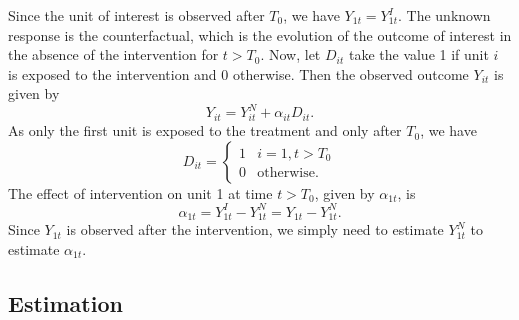 \documentclass[12pt,nobind, a4paper]{reedthesis}
\begin{document}
 Since the unit of interest is observed after \(T_0\), we have \(Y_{1t}=Y^{I}_{1t}\). The unknown response is the counterfactual, which is the evolution of the outcome of interest in the absence of the intervention for \(t>T_0\). Now, let \(D_{it}\) take the value 1 if unit \(i\) is exposed to the intervention and 0 otherwise. Then the observed outcome \(Y_{it}\) is given by
 \begin{equation}
 Y_{it}= Y^{N}_{it} + \alpha_{it} D_{it}.
 \label{eq:eq1}
 \end{equation}
 As only the first unit is exposed to the treatment and only after \(T_0\), we have
 \begin{equation}
 D_{it} = 
 \begin{cases} 
 1 &  i=1, t>T_0 \\
 0 &\text{otherwise}.
 \end{cases}
 \label{eq:eq2}
 \end{equation}
 The effect of intervention on unit 1 at time \(t>T_0\), given by \(\alpha_{1t}\), is
 \begin{equation}
 \alpha_{1t}= Y^{I}_{1t}-Y^{N}_{1t}= Y_{1t}-Y^{N}_{1t}.
 \label{eq:eq3}
 \end{equation}
 Since \(Y_{1t}\) is observed after the intervention, we simply need to estimate \(Y^{N}_{1t}\) to estimate \(\alpha_{1t}\).

 \hypertarget{estimation}{%
 \subsection{Estimation}\label{estimation}}
\end{document}
